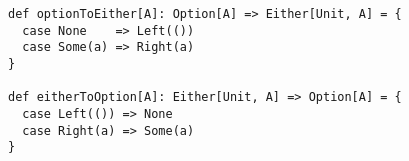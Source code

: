 \begin{algorithm}

\begin{verbatim}
def optionToEither[A]: Option[A] => Either[Unit, A] = {
  case None    => Left(())
  case Some(a) => Right(a)
}

def eitherToOption[A]: Either[Unit, A] => Option[A] = {
  case Left(()) => None
  case Right(a) => Some(a)
}
\end{verbatim}

\caption{ with  as error type is isomorphic to . %
\label{isomorphism}}
\end{algorithm}